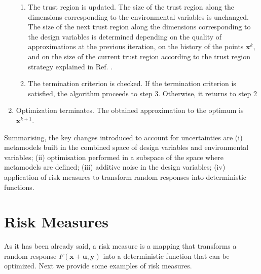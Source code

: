 \documentclass[10pt,twocolumn,a4paper]{article}
\begin{document}
\begin{enumerate}
\begin{enumerate}[label=(\alph*)]
    \item The trust region is updated. The size of the trust region along the dimensions corresponding to the environmental variables is unchanged. The size of the next trust region along the dimensions corresponding to the design variables is determined depending on the quality of approximations at the previous iteration, on the history of the points $\pmb x^k$, and on the size of the current trust region according to the trust region strategy explained in Ref. \cite{KeulenToropovMarkine1996}.
    \item The termination criterion is checked. If the termination criterion is satisfied, the algorithm proceeds to step 3. Otherwise, it returns to step 2
  \end{enumerate}
  \item Optimization terminates. The obtained approximation to the optimum is $\pmb x^{k+1}$.
\end{enumerate}

Summarising, the key changes introduced to account for uncertainties are (i) metamodels built in the combined space of design variables and environmental variables; (ii) optimisation performed in a subspace of the space where metamodels are defined; (iii) additive noise in the design variables; (iv) application of risk measures to transform random responses into deterministic functions.

\section{Risk Measures}
\label{sec:risk}

As it has been already said, a risk measure is a mapping that transforms a random response $F(\pmb x+ \pmb u,\pmb y)$  into a deterministic function that can be optimized. Next we provide some examples of risk measures\cite{RockafellarUryasev2000,SchillingsSchulz2015}.
\end{document}
